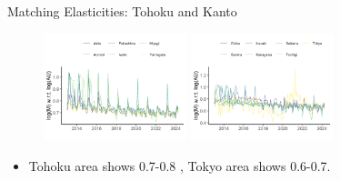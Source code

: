 \documentclass[aspectratio=169]{beamer}
\begin{document}
\begin{frame}{Matching Elasticities: Tohoku and Kanto}
\begin{figure}[!ht]
  \begin{center}
  \includegraphics[width = 0.37\textwidth]
  {figuretable/elasticity_unemployed_month_aggregate_tohoku.png}
  \includegraphics[width = 0.37\textwidth]
  {figuretable/elasticity_unemployed_month_aggregate_kanto.png}
  \end{center}
  \footnotesize
\end{figure} 
\begin{itemize}
    \item Tohoku area shows 0.7-0.8 , Tokyo area shows 0.6-0.7.
\end{itemize}
\end{frame}
\end{document}
